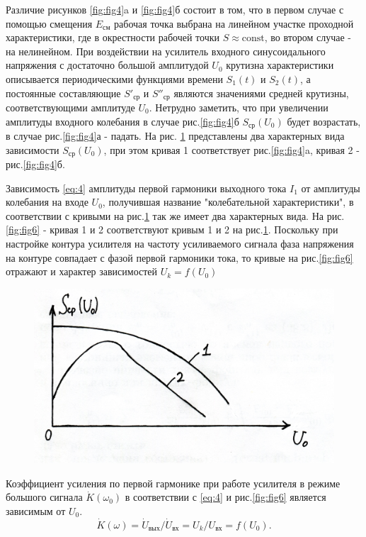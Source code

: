 Различие рисунков \ref{fig:fig4}a и \ref{fig:fig4}б состоит в том, что в первом случае с помощью смещения $E_\text{см}$ рабочая точка выбрана на линейном участке проходной характеристики, где в окрестности рабочей точки $S\approx\text{const}$, во втором случае - на нелинейном. При воздействии на усилитель входного синусоидального напряжения с достаточно большой амплитудой $U_0$ крутизна характеристики описывается периодическими функциями времени $S_1(t)$ и $S_2(t)$, а постоянные составляющие $S'_\text{ср}$ и $S''_\text{ср}$ являются значениями средней крутизны, соответствующими амплитуде $U_0$. Нетрудно заметить, что при увеличении амплитуды входного колебания в случае рис.\ref{fig:fig4}б $S_\text{ср}(U_0)$ будет возрастать, в случае рис.\ref{fig:fig4}а - падать. На рис. \ref{fig:fig5} представлены два характерных вида зависимости $S_\text{ср}(U_0)$, при этом кривая 1 соответствует рис.\ref{fig:fig4}a, кривая 2 - рис.\ref{fig:fig4}б.

Зависимость \eqref{eq:4} амплитуды первой гармоники выходного тока $I_1$ от амплитуды колебания на входе $U_0$, получившая название "колебательной характеристики", в соответствии с кривыми на рис.\ref{fig:fig5} так же имеет два характерных вида. На рис.\ref{fig:fig6} - кривая 1 и 2 соответствуют кривым 1 и 2 на рис.\ref{fig:fig5}. Поскольку при настройке контура усилителя на частоту усиливаемого сигнала фаза напряжения на контуре совпадает с фазой первой гармоники тока, то кривые на рис.\ref{fig:fig6} отражают и характер зависимостей $U_k=f(U_0)$

\begin{figure}[h]
	\centering
	\includegraphics[width=0.6\linewidth]{circuit/fig5}
	\caption{}
	\label{fig:fig5}
\end{figure}

Коэффициент усиления по первой гармонике при работе усилителя в режиме большого сигнала $\dot{K}(\omega_0)$ в соответствии с \eqref{eq:4} и рис.\ref{fig:fig6} является зависимым от $U_0$.
\begin{equation}
\dot{K}(\omega)=\dot{U}_\text{вых}/\dot{U}_\text{вх}=U_k/U_\text{вх}=f(U_0).
\label{eq:6}
\end{equation}

